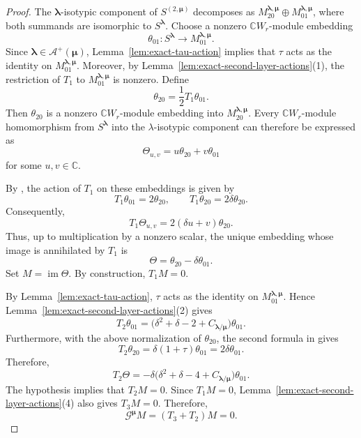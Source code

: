 \documentclass[10pt,a4paper]{amsart}
\newcommand{\C}{\mathbb{C}}
\newcommand{\1}{\mathfrak{1}}
\begin{document}
\begin{proof}
The $\bm\lambda$-isotypic component of $S^{(2,\bm\mu)}$
decomposes as
$M_{20}^{\bm\lambda,\bm\mu}\oplus
M_{01}^{\bm\lambda,\bm\mu}$,
where both summands are isomorphic to $S^{\bm\lambda}$.
Choose a nonzero $\C W_r$-module embedding
$$
\theta_{01}:S^{\bm\lambda}\longrightarrow
M_{01}^{\bm\lambda,\bm\mu}.
$$
Since $\bm\lambda\in\mathcal A^+(\bm\mu)$,
Lemma~\ref{lem:exact-tau-action} implies that $\tau$
acts as the identity on $M_{01}^{\bm\lambda,\bm\mu}$.
Moreover, by Lemma~\ref{lem:exact-second-layer-actions}(1),
the restriction of $T_1$ to
$M_{01}^{\bm\lambda,\bm\mu}$ is nonzero.
Define
$$
\theta_{20}=\frac12T_1\theta_{01}.
$$
Then $\theta_{20}$ is a nonzero $\C W_r$-module embedding into $M_{20}^{\bm\lambda,\bm\mu}$.
Every $\C W_r$-module homomorphism from $S^{\bm\lambda}$ into the $\lambda$-isotypic component can therefore be expressed as
$$
\Theta_{u,v}=u\theta_{20}+v\theta_{01}
$$
for some $u,v\in\C$.

By \cite[Lemma~5.2]{KCTprevious}, the action of $T_1$
on these embeddings is given by
$$
T_1\theta_{01}=2\theta_{20},
\qquad
T_1\theta_{20}=2\delta\theta_{20}.
$$
Consequently,
\begin{equation}\label{eq:exact-T1-plus}
T_1\Theta_{u,v}=2(\delta u+v)\theta_{20}.
\end{equation}
Thus, up to multiplication by a nonzero scalar,
the unique embedding whose image is annihilated by $T_1$ is
$$
\Theta=\theta_{20}-\delta\theta_{01}.
$$
Set $M=\operatorname{im}\Theta$.
By construction, $T_1M=0$.

By Lemma~\ref{lem:exact-tau-action}, $\tau$ acts as the identity on $M_{01}^{\bm\lambda,\bm\mu}$. Hence Lemma~\ref{lem:exact-second-layer-actions}(2) gives
$$
T_2\theta_{01}=
\bigl(\delta^2+\delta-2+C_{\bm\lambda/\bm\mu}\bigr)
\theta_{01}.
$$
Furthermore, with the above normalization of $\theta_{20}$,
the second formula in \cite[Proposition~5.3(ii)]{KCTprevious} gives
$$
T_2\theta_{20}=\delta(1+\tau)\theta_{01}
=2\delta\theta_{01}.
$$
Therefore,
\begin{equation}\label{eq:exact-T2-plus}
T_2\Theta
=-\delta
\bigl(\delta^2+\delta-4+C_{\bm\lambda/\bm\mu}\bigr)
\theta_{01}.
\end{equation}
The hypothesis implies that $T_2M=0$.
Since $T_1M=0$, Lemma~\ref{lem:exact-second-layer-actions}(4)
also gives $T_3M=0$.
Therefore,
$$
\mathcal G^{\bm\mu}M=(T_3+T_2)M=0.
$$


\end{proof}
\end{document}
